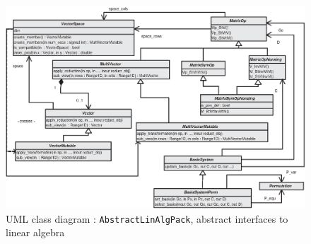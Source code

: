 \documentclass[pdf,12pt,report]{SANDreport}
\begin{document}
{\bsinglespace
\begin{figure}[t]
\begin{center}
\includegraphics*[bb= 0.0in 0.0in 7.9in 5.6in,scale=0.70
]{AbstractLinAlgPack}
\end{center}
\caption{\label{moocho:fig:AbstractLinAlgPack}
UML class diagram : {}\texttt{AbstractLinAlgPack}, abstract interfaces to linear algebra
}
\end{figure}
\esinglespace}
\end{document}
